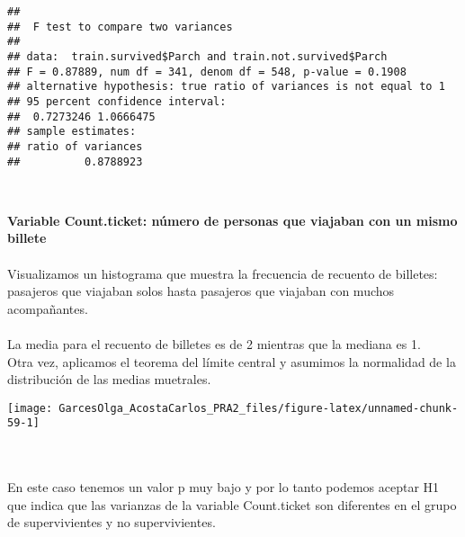 \documentclass[
]{article}
\newenvironment{Shaded}{\begin{snugshade}}{\end{snugshade}}
\newcommand{\KeywordTok}[1]{\textcolor[rgb]{0.13,0.29,0.53}{\textbf{#1}}}
\newcommand{\NormalTok}[1]{#1}
\newcommand{\OperatorTok}[1]{\textcolor[rgb]{0.81,0.36,0.00}{\textbf{#1}}}
\newcommand{\StringTok}[1]{\textcolor[rgb]{0.31,0.60,0.02}{#1}}
\begin{document}
\begin{Shaded}
\end{Shaded}

\begin{verbatim}
## 
##  F test to compare two variances
## 
## data:  train.survived$Parch and train.not.survived$Parch
## F = 0.87889, num df = 341, denom df = 548, p-value = 0.1908
## alternative hypothesis: true ratio of variances is not equal to 1
## 95 percent confidence interval:
##  0.7273246 1.0666475
## sample estimates:
## ratio of variances 
##          0.8788923
\end{verbatim}

\texttt{}~\\
\texttt{}

\textbf{Variable Count.ticket: número de personas que viajaban con un
mismo billete}\\
\texttt{}~\\
Visualizamos un histograma que muestra la frecuencia de recuento de
billetes: pasajeros que viajaban solos hasta pasajeros que viajaban con
muchos acompañantes.\\
\texttt{}~\\
La media para el recuento de billetes es de 2 mientras que la mediana es
1. \texttt{}\\
Otra vez, aplicamos el teorema del límite central y asumimos la
normalidad de la distribución de las medias muetrales.\\
\texttt{}

\begin{Shaded}
\end{Shaded}

\begin{center}\texttt{[image: GarcesOlga\_AcostaCarlos\_PRA2\_files/figure-latex/unnamed-chunk-59-1]} \end{center}

\texttt{}~\\
\texttt{}~\\
En este caso tenemos un valor p muy bajo y por lo tanto podemos aceptar
H1 que indica que las varianzas de la variable Count.ticket son
diferentes en el grupo de supervivientes y no supervivientes.\\
\texttt{}
\end{document}
